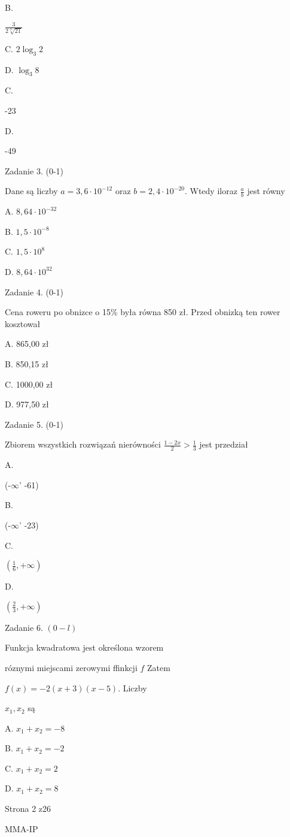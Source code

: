 \documentclass[a4paper,12pt]{article}
\begin{document}
B.

$\displaystyle \frac{3}{2\sqrt[3]{21}}$

C. $2\log_{3}2$

D. $\log_{3}8$

C.

-23

D.

-49

Zadanie 3. (0-1)

Dane są liczby $a=3,6\cdot 10^{-12}$ oraz $b=2,4\cdot 10^{-20}$. Wtedy iloraz $\displaystyle \frac{a}{b}$ jest równy

A. $8,64\cdot 10^{-32}$

B. $1,5\cdot 10^{-8}$

C. $1,5\cdot 10^{8}$

D. $8,64\cdot 10^{32}$

Zadanie 4. (0-1)

Cena roweru po obnizce o 15\% była równa 850 zł. Przed obnizką ten rower kosztował

A. 865,00 zł

B. 850,15 zł

C. 1000,00 zł

D. 977,50 zł

Zadanie 5. (0-1)

Zbiorem wszystkich rozwiązań nierówności $\displaystyle \frac{1-2x}{2}>\frac{1}{3}$ jest przedział

A.

(-$\infty$' -61)

B.

(-$\infty$' -23)

C.

$(\displaystyle \frac{1}{6},+\infty)$

D.

$(\displaystyle \frac{2}{3},+\infty)$

Zadanie 6. $(0-l)$

Funkcja kwadratowa jest określona wzorem

róznymi miejscami zerowymi ffinkcji $f$ Zatem

$f(x)=-2(x+3)(x-5)$. Liczby

$x_{1}, x_{2}$ są

A. $x_{1}+x_{2}=-8$

B. $x_{1}+x_{2}=-2$

C. $x_{1}+x_{2}=2$

D. $x_{1}+x_{2}=8$

Strona 2 z26

MMA-IP
\end{document}
